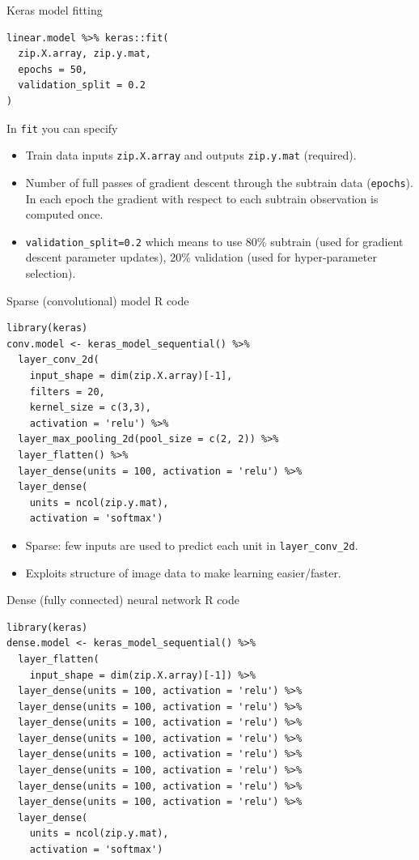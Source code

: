 \documentclass[12pt]{article}
\begin{document}
{Keras model fitting}
\begin{verbatim}
linear.model %>% keras::fit(
  zip.X.array, zip.y.mat,
  epochs = 50,
  validation_split = 0.2
)
\end{verbatim}
In \texttt{fit} you can specify
\begin{itemize}
\item Train data inputs \texttt{zip.X.array} and outputs
  \texttt{zip.y.mat} (required).
\item Number of full passes of gradient descent through the subtrain
  data (\texttt{epochs}). In each epoch the gradient with respect to
  each subtrain observation is computed once.
\item \texttt{validation\_split=0.2} which means to use 80\% subtrain
  (used for gradient descent parameter updates), 20\% validation (used
  for hyper-parameter selection). 
\end{itemize}

{Sparse (convolutional) model R code}
\begin{verbatim}
library(keras)
conv.model <- keras_model_sequential() %>%
  layer_conv_2d(
    input_shape = dim(zip.X.array)[-1],
    filters = 20,
    kernel_size = c(3,3),
    activation = 'relu') %>% 
  layer_max_pooling_2d(pool_size = c(2, 2)) %>%
  layer_flatten() %>%
  layer_dense(units = 100, activation = 'relu') %>% 
  layer_dense(
    units = ncol(zip.y.mat), 
    activation = 'softmax')
\end{verbatim}
  \begin{itemize}
  \item Sparse: few inputs are used to predict each unit in
    \texttt{layer\_conv\_2d}.
  \item Exploits structure of image data to make learning
    easier/faster.
  \end{itemize}

{Dense (fully connected) neural network R code}
\begin{verbatim}
library(keras)
dense.model <- keras_model_sequential() %>%
  layer_flatten(
    input_shape = dim(zip.X.array)[-1]) %>%
  layer_dense(units = 100, activation = 'relu') %>% 
  layer_dense(units = 100, activation = 'relu') %>% 
  layer_dense(units = 100, activation = 'relu') %>% 
  layer_dense(units = 100, activation = 'relu') %>%
  layer_dense(units = 100, activation = 'relu') %>%
  layer_dense(units = 100, activation = 'relu') %>% 
  layer_dense(units = 100, activation = 'relu') %>%   
  layer_dense(units = 100, activation = 'relu') %>% 
  layer_dense(
    units = ncol(zip.y.mat), 
    activation = 'softmax')
\end{verbatim}
\end{document}
